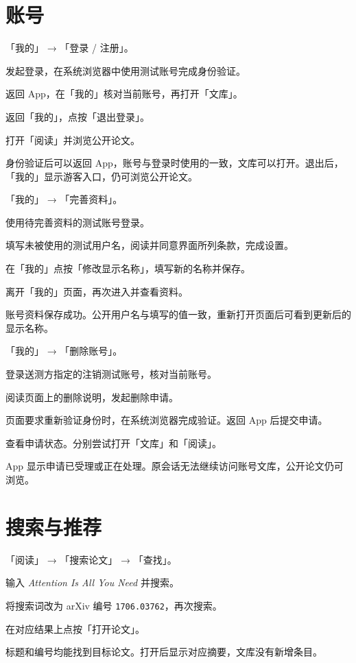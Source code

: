 \documentclass[UTF8,a4paper,zihao=-4,fontset=fandol]{ctexart}
\newcommand{\ui}[1]{「#1」}
\newcommand{\sampletitle}{\textit{Attention Is All You Need}}
\newcommand{\arxivsample}{\texttt{1706.03762}}
\begin{document}
\clearpage
{}
\section{账号}

  {\ui{我的} → \ui{登录 / 注册}。}
  {\item 发起登录，在系统浏览器中使用测试账号完成身份验证。
   \item 返回 App，在\ui{我的}核对当前账号，再打开\ui{文库}。
   \item 返回\ui{我的}，点按\ui{退出登录}。
   \item 打开\ui{阅读}并浏览公开论文。}
  {身份验证后可以返回 App，账号与登录时使用的一致，文库可以打开。退出后，\ui{我的}显示游客入口，仍可浏览公开论文。}

  {\ui{我的} → \ui{完善资料}。}
  {\item 使用待完善资料的测试账号登录。
   \item 填写未被使用的测试用户名，阅读并同意界面所列条款，完成设置。
   \item 在\ui{我的}点按\ui{修改显示名称}，填写新的名称并保存。
   \item 离开\ui{我的}页面，再次进入并查看资料。}
  {账号资料保存成功。公开用户名与填写的值一致，重新打开页面后可看到更新后的显示名称。}

  {\ui{我的} → \ui{删除账号}。}
  {\item 登录送测方指定的注销测试账号，核对当前账号。
   \item 阅读页面上的删除说明，发起删除申请。
   \item 页面要求重新验证身份时，在系统浏览器完成验证。返回 App 后提交申请。
   \item 查看申请状态。分别尝试打开\ui{文库}和\ui{阅读}。}
  {App 显示申请已受理或正在处理。原会话无法继续访问账号文库，公开论文仍可浏览。}

\clearpage
{}
\section{搜索与推荐}

  {\ui{阅读} → \ui{搜索论文} → \ui{查找}。}
  {\item 输入 \sampletitle{} 并搜索。
   \item 将搜索词改为 arXiv 编号 \arxivsample{}，再次搜索。
   \item 在对应结果上点按\ui{打开论文}。}
  {标题和编号均能找到目标论文。打开后显示对应摘要，文库没有新增条目。}
\end{document}
